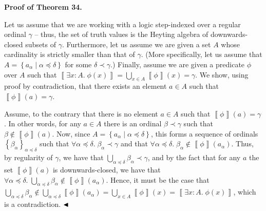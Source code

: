 \documentclass[10pt,a4paper]{article}
\begin{document}
 
 
\par\medskip\noindent\textbf{Proof of Theorem 34.}\par
 
 
Let us assume that we are working with a logic step-indexed over a regular ordinal $\gamma$ – thus, the set of truth values is the Heyting algebra of downwards-closed subsets of $\gamma$. Furthermore, let us assume we are given a set $A$ whose cardinality is strictly smaller than that of $\gamma$. (More specifically, let us assume that $A=\left\{a_{\alpha}\middle|\alpha\preceq\delta\right\}$ for some $\delta\prec\gamma$.) Finally, assume we are given a predicate $\phi$ over $A$ such that $\left\llbracket\exists x:A.\;\phi(x)\right\rrbracket=\bigcup_{x\in A}\left\llbracket\phi\right\rrbracket(x)=\gamma$. We show, using proof by contradiction, that there exists an element $a\in A$ such that $\left\llbracket\phi\right\rrbracket(a)=\gamma$.\par
 
 
 
Assume, to the contrary that there is no element $a\in A$ such that $\left\llbracket\phi\right\rrbracket(a)=\gamma$. In other words, for any $a\in A$ there is an ordinal $\beta\prec\gamma$ such that $\beta\not\in\left\llbracket\phi\right\rrbracket(a)$. Now, since $A=\left\{a_{\alpha}\middle|\alpha\preceq\delta\right\}$, this forms a sequence of ordinals $\left\{\beta_{\alpha}\right\}_{\alpha\preceq\delta}$ such that $\forall\alpha\preceq\delta.\;\beta_{\alpha}\prec\gamma$ and that $\forall\alpha\preceq\delta.\;\beta_{\alpha}\not\in\left\llbracket\phi\right\rrbracket(a_{\alpha})$. Thus, by regularity of $\gamma$, we have that $\bigcup_{\alpha\preceq\delta}\beta_{\alpha}\prec\gamma$, and by the fact that for any $a$ the set $\left\llbracket\phi\right\rrbracket(a)$ is downwards-closed, we have that $\forall\alpha\preceq\delta.\;\bigcup_{\alpha\preceq\delta}\beta_{\alpha}\not\in\left\llbracket\phi\right\rrbracket(a_{\alpha})$. Hence, it must be the case that $\bigcup_{\alpha\preceq\delta}\beta_{\alpha}\not\in\bigcup_{\alpha\preceq\delta}\left\llbracket\phi\right\rrbracket(a_{\alpha})=\bigcup_{x\in A}\left\llbracket\phi\right\rrbracket(x)=\left\llbracket\exists x:A.\;\phi(x)\right\rrbracket$, which is a contradiction. $\hfill\blacktriangleleft$\par
 
\end{document}
